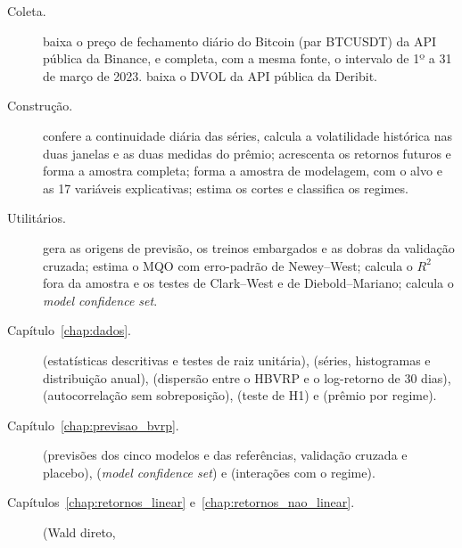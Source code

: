 \begin{description}
    \item[Coleta.]  baixa o preço de
          fechamento diário do Bitcoin (par BTCUSDT) da API pública da Binance,
          e  completa, com a mesma
          fonte, o intervalo de 1º a 31 de março de 2023.
           baixa o DVOL da API pública
          da Deribit.
    \item[Construção.]  confere a
          continuidade diária das séries, calcula a volatilidade histórica nas
          duas janelas e as duas medidas do prêmio;
           acrescenta os retornos futuros e
          forma a amostra completa; 
          forma a amostra de modelagem, com o alvo e as 17 variáveis
          explicativas;  estima os cortes e
          classifica os regimes.
    \item[Utilitários.]  gera as origens de
          previsão, os treinos embargados e as dobras da validação cruzada;
           estima o MQO com erro-padrão de
          Newey--West;  calcula o $R^2$ fora
          da amostra e os testes de Clark--West e de Diebold--Mariano;
           calcula o \textit{model confidence set}.
    \item[Capítulo~\ref{chap:dados}.] 
          (estatísticas descritivas e testes de raiz unitária),
           (séries, histogramas e distribuição
          anual),  (dispersão entre
          o HBVRP e o log-retorno de 30 dias), 
          (autocorrelação sem sobreposição), 
          (teste de H1) e  (prêmio por
          regime).
    \item[Capítulo~\ref{chap:previsao_bvrp}.] 
          (previsões dos cinco modelos e das referências, validação cruzada e
          placebo),  (\textit{model
          confidence set}) e  (interações
          com o regime).
    \item[Capítulos~\ref{chap:retornos_linear}
          e~\ref{chap:retornos_nao_linear}.]
           (Wald direto,

\end{description}
